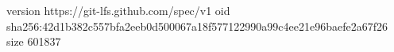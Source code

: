 version https://git-lfs.github.com/spec/v1
oid sha256:42d1b382c557bfa2eeb0d500067a18f577122990a99c4ee21e96baefe2a67f26
size 601837
